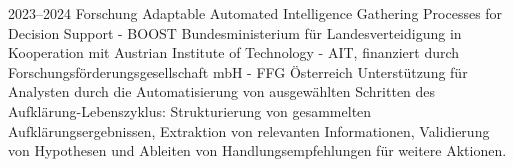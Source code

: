 \cventry
{2023--2024}
{Forschung}
{Adaptable Automated Intelligence Gathering Processes for Decision Support - BOOST}
{
  Bundesministerium für Landesverteidigung
  in Kooperation mit Austrian Institute of Technology - AIT,
  finanziert durch Forschungsförderungsgesellschaft mbH - FFG}
{Österreich}
{
  Unterstützung für Analysten durch die Automatisierung von ausgewählten Schritten des
  Aufklärung-Lebenszyklus: Strukturierung von gesammelten Aufklärungsergebnissen, Extraktion von
  relevanten Informationen, Validierung von Hypothesen und Ableiten von Handlungsempfehlungen
  für weitere Aktionen.
}
